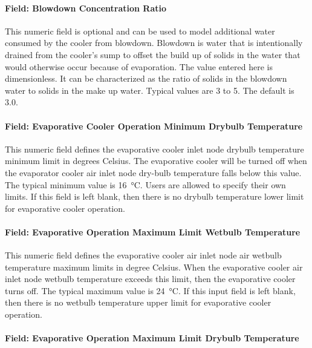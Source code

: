 \paragraph{Field: Blowdown Concentration Ratio}\label{field-blowdown-concentration-ratio-000}

This numeric field is optional and can be used to model additional water consumed by the cooler from blowdown. Blowdown is water that is intentionally drained from the cooler's sump to offset the build up of solids in the water that would otherwise occur because of evaporation. The value entered here is dimensionless. It can be characterized as the ratio of solids in the blowdown water to solids in the make up water. Typical values are 3 to 5. The default is 3.0.

\paragraph{Field: Evaporative Cooler Operation Minimum Drybulb Temperature}\label{field-evaporative-cooler-operation-minimum-drybulb-temperature}

This numeric field defines the evaporative cooler inlet node drybulb temperature minimum limit in degrees Celsius. The evaporative cooler will be turned off when the evaporator cooler air inlet node dry-bulb temperature falls below this value. The typical minimum value is \SI{16}{\celsius}. Users are allowed to specify their own limits. If this field is left blank, then there is no drybulb temperature lower limit for evaporative cooler operation.

\paragraph{Field: Evaporative Operation Maximum Limit Wetbulb Temperature}\label{field-evaporative-operation-maximum-limit-wetbulb-temperature}

This numeric field defines the evaporative cooler air inlet node air wetbulb temperature maximum limits in degree Celsius. When the evaporative cooler air inlet node wetbulb temperature exceeds this limit, then the evaporative cooler turns off. The typical maximum value is \SI{24}{\celsius}. If this input field is left blank, then there is no wetbulb temperature upper limit for evaporative cooler operation.

\paragraph{Field: Evaporative Operation Maximum Limit Drybulb Temperature}\label{field-evaporative-operation-maximum-limit-drybulb-temperature}

